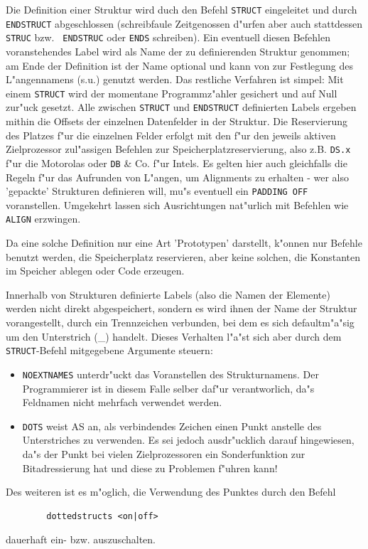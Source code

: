 \documentclass[12pt,a4paper,twoside]{report}
\newcommand{\tty}[1]{{\tt #1}}
\newcommand{\asname}{AS}
\begin{document}
Die Definition einer Struktur wird duch den Befehl \tty{STRUCT}
eingeleitet und durch \tty{ENDSTRUCT} abgeschlossen (schreibfaule
Zeitgenossen d"urfen aber auch stattdessen {\tt STRUC} bzw.  {\tt
ENDSTRUC} oder {\tt ENDS} schreiben).  Ein eventuell diesen Befehlen
voranstehendes Label wird als Name der zu definierenden Struktur
genommen; am Ende der Definition ist der Name optional und kann von
zur Festlegung des L"angennamens (s.u.) genutzt werden.  Das
restliche Verfahren ist simpel: Mit einem \tty{STRUCT} wird der
momentane Programmz"ahler gesichert und auf Null zur"uck gesetzt.
Alle zwischen \tty{STRUCT} und \tty{ENDSTRUCT} definierten Labels
ergeben mithin die Offsets der einzelnen Datenfelder in der Struktur.
Die Reservierung des Platzes f"ur die einzelnen Felder erfolgt mit
den f"ur den jeweils aktiven Zielprozessor zul"assigen Befehlen zur
Speicherplatzreservierung, also z.B.  \tty{DS.x} f"ur die Motorolas
oder \tty{DB} \& Co.  f"ur Intels.  Es gelten hier auch gleichfalls
die Regeln f"ur das Aufrunden von L"angen, um Alignments zu erhalten
- wer also 'gepackte' Strukturen definieren will, mu"s eventuell ein
{\tt PADDING OFF} voranstellen.  Umgekehrt lassen sich Ausrichtungen
nat"urlich mit Befehlen wie {\tt ALIGN} erzwingen.

Da eine solche Definition nur eine Art 'Prototypen' darstellt, k"onnen nur
Befehle benutzt werden, die Speicherplatz reservieren, aber keine solchen,
die Konstanten im Speicher ablegen oder Code erzeugen.

Innerhalb von Strukturen definierte Labels (also die Namen der Elemente)
werden nicht direkt abgespeichert, sondern es wird ihnen der Name der
Struktur vorangestellt, durch ein Trennzeichen verbunden, bei dem es sich
defaultm"a"sig um den Unterstrich (\_) handelt.  Dieses Verhalten l"a"st
sich aber durch dem \tty{STRUCT}-Befehl mitgegebene Argumente steuern:
\begin{itemize}
\item{\tty{NOEXTNAMES} unterdr"uckt das Voranstellen des Strukturnamens.
      Der Programmierer ist in diesem Falle selber daf"ur verantworlich,
      da"s Feldnamen nicht mehrfach verwendet werden.}
\item{\tty{DOTS} weist \asname{} an, als verbindendes Zeichen einen Punkt
      anstelle des Unterstriches zu verwenden.  Es sei jedoch
      ausdr"ucklich darauf hingewiesen, da"s der Punkt bei vielen
      Zielprozessoren ein Sonderfunktion zur Bitadressierung hat und
      diese zu Problemen f"uhren kann!}
\end{itemize}
Des weiteren ist es m"oglich, die Verwendung des Punktes durch den Befehl
\begin{verbatim}
        dottedstructs <on|off>
\end{verbatim}
dauerhaft ein- bzw. auszuschalten.
\end{document}
